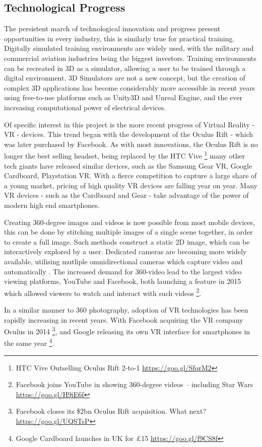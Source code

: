 \documentclass[a4paper, openright, twoside]{report}
\begin{document}
\subsection{Technological Progress} \label{tech_progress}
The persistent march of technological innovation and progress present opportunities in every  industry, this is similarly true for practical training. Digitally simulated training environments are widely used, with the military and commercial aviation industries being the biggest investors. Training environments can be recreated in 3D as a simulator, allowing a user to be trained through a digital environment. 3D Simulators are not a new concept, but the creation of complex 3D applications has become considerably more accessible in recent years using free-to-use platforms such as Unity3D and Unreal Engine, and the ever increasing computational power of electrical devices. 

Of specific interest in this project is the more recent progress of Virtual Reality - VR - devices. This trend began with the development of the Oculus Rift - which was later purchased by Facebook. As with most innovations, the Oculus Rift is no longer the best selling headset, being replaced by the HTC Vive \footnote{HTC Vive Outselling Oculus Rift 2-to-1 \url{https://goo.gl/SfqrM2}} many other tech giants have released similar devices, such as the Samsung Gear VR, Google Cardboard, Playstation VR. With a fierce competition to capture a large share of a young market, pricing of high quality VR devices are falling year on year. Many VR devices - such as the Cardboard and Gear - take advantage of the power of modern high end smartphones. 

Creating 360-degree images and videos is now possible from most mobile devices, this can be done by stitching multiple images of a single scene together, in order to create a full image. Such methods construct a static 2D image, which can be interactively explored by a user. Dedicated cameras are becoming more widely available, utilising mutliple omnidirectional cameras which capture video and automatically . The increased demand for 360-video lead to the largest video viewing platforms, YouTube and Facebook, both launching a feature in 2015 which allowed viewers to watch and interact with such videos \footnote{Facebook joins YouTube in showing 360-degree videos – including Star Wars \url{https://goo.gl/H9iE6f}}. 

In a similar manner to 360 photography, adoption of VR technologies has been rapidly increasing in recent years. With Facebook acquiring the VR company Oculus in 2014 \footnote{Facebook closes its \$2bn Oculus Rift acquisition. What next? \url{https://goo.gl/UQSTsP}}, and Google releasing its own VR interface for smartphones in the same year \footnote{Google Cardboard launches in UK for £15 \url{https://goo.gl/f9CS8f}}.  
\end{document}
